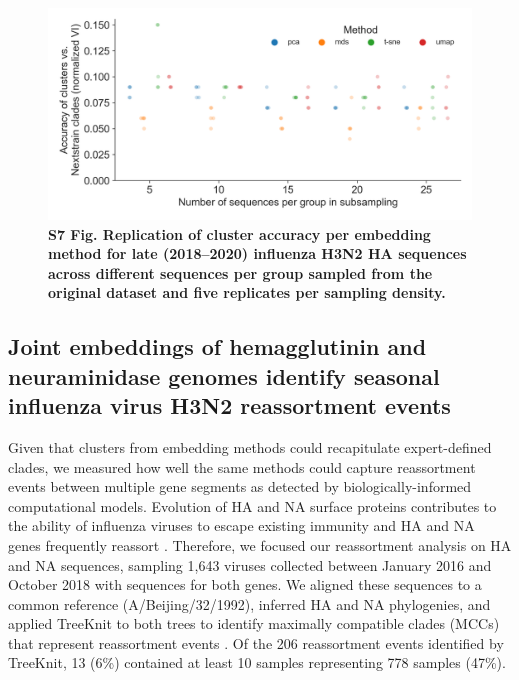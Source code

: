 \documentclass[10pt,letterpaper]{article}
\begin{document}
\begin{figure}[!h]
\includegraphics[width=\columnwidth]{figures/flu-2018-2020-replication-of-cluster-accuracy.png}
\caption*{{\bf S7 Fig. Replication of cluster accuracy per embedding method for late (2018--2020) influenza H3N2 HA sequences across different sequences per group sampled from the original dataset and five replicates per sampling density.}}
\end{figure}

\subsection*{Joint embeddings of hemagglutinin and neuraminidase genomes identify seasonal influenza virus H3N2 reassortment events}

Given that clusters from embedding methods could recapitulate expert-defined clades, we measured how well the same methods could capture reassortment events between multiple gene segments as detected by biologically-informed computational models.
Evolution of HA and NA surface proteins contributes to the ability of influenza viruses to escape existing immunity \cite{Petrova2018} and HA and NA genes frequently reassort \cite{Nelson2008,Marshall2013,Potter2019}.
Therefore, we focused our reassortment analysis on HA and NA sequences, sampling 1,643 viruses collected between January 2016 and October 2018 with sequences for both genes.
We aligned these sequences to a common reference (A/Beijing/32/1992), inferred HA and NA phylogenies, and applied TreeKnit to both trees to identify maximally compatible clades (MCCs) that represent reassortment events \cite{Barrat-Charlaix2022}.
Of the 206 reassortment events identified by TreeKnit, 13 (6\%) contained at least 10 samples representing 778 samples (47\%).
\end{document}
